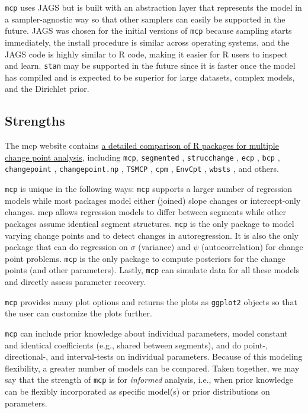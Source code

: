 \documentclass[
  american,
]{article}
\begin{document}
\texttt{mcp} uses JAGS \citep{plummer2003} but is built with an abstraction layer that represents the model in a sampler-agnostic way so that other samplers can easily be supported in the future. JAGS was chosen for the initial versions of \texttt{mcp} because sampling starts immediately, the install procedure is similar across operating systems, and the JAGS code is highly similar to R code, making it easier for R users to inspect and learn. \texttt{stan} \citep{carpenter2017} may be supported in the future since it is faster once the model has compiled and is expected to be superior for large datasets, complex models, and the Dirichlet prior.

\hypertarget{strengths}{%
\subsection{Strengths}\label{strengths}}

The mcp website contains \href{https://lindeloev.github.io/mcp/articles/packages.html}{a detailed comparison of R packages for multiple change point analysis}, including \texttt{mcp}, \texttt{segmented} \citep{muggeo2008}, \texttt{strucchange} \citep[\citet{zeileis2003}]{zeileis2002}, \texttt{ecp} \citep{james2015}, \texttt{bcp} \citep{erdman2007}, \texttt{changepoint} \citep{killick2014}, \texttt{changepoint.np} \citep{haynes2019}, \texttt{TSMCP} \citep{li2018}, \texttt{cpm} \citep{ross2015}, \texttt{EnvCpt} \citep{killick2018}, \texttt{wbsts} \citep{korkas2018}, and others.

\texttt{mcp} is unique in the following ways: \texttt{mcp} supports a larger number of regression models while most packages model either (joined) slope changes or intercept-only changes. mcp allows regression models to differ between segments while other packages assume identical segment structures. \texttt{mcp} is the only package to model varying change points and to detect changes in autoregression. It is also the only package that can do regression on \(\sigma\) (variance) and \(\psi\) (autocorrelation) for change point problems. \texttt{mcp} is the only package to compute posteriors for the change points (and other parameters). Lastly, \texttt{mcp} can simulate data for all these models and directly assess parameter recovery.

\texttt{mcp} provides many plot options and returns the plots as \texttt{ggplot2} objects so that the user can customize the plots further.

\texttt{mcp} can include prior knowledge about individual parameters, model constant and identical coefficients (e.g., shared between segments), and do point-, directional-, and interval-tests on individual parameters. Because of this modeling flexibility, a greater number of models can be compared. Taken together, we may say that the strength of \texttt{mcp} is for \emph{informed} analysis, i.e., when prior knowledge can be flexibly incorporated as specific model(s) or prior distributions on parameters.
\end{document}
